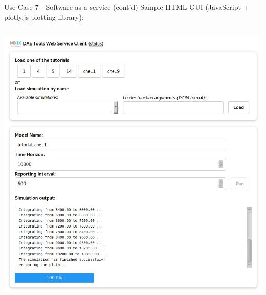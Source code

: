 \documentclass[compress,newPxFont,sthlmFooter]{beamer}
\begin{document}
\begin{frame}[plain]{Use Case 7 - Software as a service (cont'd)}
    \small{Sample HTML GUI (JavaScript + plotly.js plotting library):}
    
    \begin{columns}[t]
      \begin{column}{0.45\paperwidth}
        \begin{center}
            \includegraphics[align=c, width=\textwidth]{daetools_ws_html.png}
        \end{center}
      \end{column}


\end{columns}
\end{frame}
\end{document}

